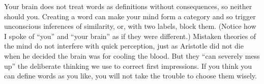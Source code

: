 Your brain does not treat words as definitions without consequences, so neither should you. Creating a word can make your mind form a category and so trigger unconscious inferences of similarity, or, with two labels, block them. (Notice how I spoke of ``you'' and ``your brain'' as if they were different.) Mistaken theories of the mind do not interfere with quick perception, just as Aristotle did not die when he decided the brain was for cooling the blood. But they ``can severely mess up'' the deliberate thinking we use to correct first impressions. If you think you can define words as you like, you will not take the trouble to choose them wisely. 
